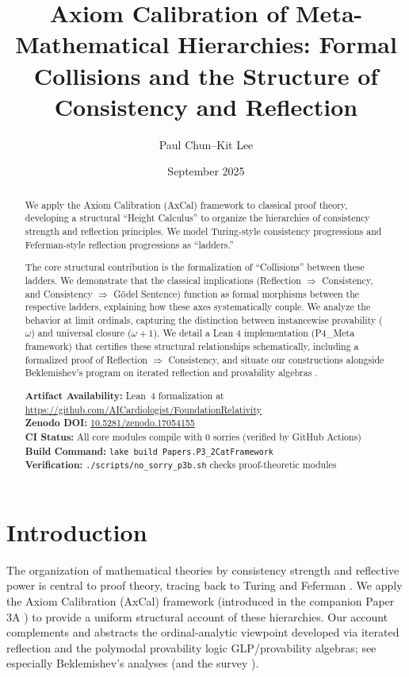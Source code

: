 \documentclass[11pt]{article}
\title{Axiom Calibration of Meta-Mathematical Hierarchies: Formal Collisions and the Structure of Consistency and Reflection}
\author{Paul Chun--Kit Lee}
\date{September 2025}
\begin{document}
\maketitle

\begin{abstract}
We apply the Axiom Calibration (AxCal) framework to classical proof theory, developing a structural ``Height Calculus'' to organize the hierarchies of consistency strength and reflection principles. We model Turing-style consistency progressions and Feferman-style reflection progressions as ``ladders.''

The core structural contribution is the formalization of ``Collisions'' between these ladders. We demonstrate that the classical implications (Reflection $\Rightarrow$ Consistency, and Consistency $\Rightarrow$ Gödel Sentence) function as formal morphisms between the respective ladders, explaining how these axes systematically couple. We analyze the behavior at limit ordinals, capturing the distinction between instancewise provability ($\omega$) and universal closure ($\omega+1$). We detail a Lean 4 implementation (P4\_Meta framework) that certifies these structural relationships schematically, including a formalized proof of Reflection $\Rightarrow$ Consistency, and situate our constructions alongside Beklemishev's program on iterated reflection and provability algebras \cite{Beklemishev2003,Beklemishev2004}.

\vspace{1em}
\noindent\textbf{Artifact Availability:} Lean~4 formalization at \url{https://github.com/AICardiologist/FoundationRelativity}\\
\textbf{Zenodo DOI:} \href{https://doi.org/10.5281/zenodo.17054155}{10.5281/zenodo.17054155}\\
\textbf{CI Status:} All core modules compile with 0 sorries (verified by GitHub Actions)\\
\textbf{Build Command:} \texttt{lake build Papers.P3\_2CatFramework}\\
\textbf{Verification:} \texttt{./scripts/no\_sorry\_p3b.sh} checks proof-theoretic modules
\end{abstract}

\tableofcontents

\section{Introduction}
The organization of mathematical theories by consistency strength and reflective power is central to proof theory, tracing back to Turing \cite{Turing1939} and Feferman \cite{Feferman1962}. We apply the Axiom Calibration (AxCal) framework (introduced in the companion Paper 3A \cite{Paper3a}) to provide a uniform structural account of these hierarchies.
Our account complements and abstracts the ordinal-analytic viewpoint developed via iterated reflection and the polymodal provability logic GLP/provability algebras; see especially Beklemishev's analyses \cite{Beklemishev2003,Beklemishev2004} (and the survey \cite{ArtemovBeklemishev2004}).
\end{document}
